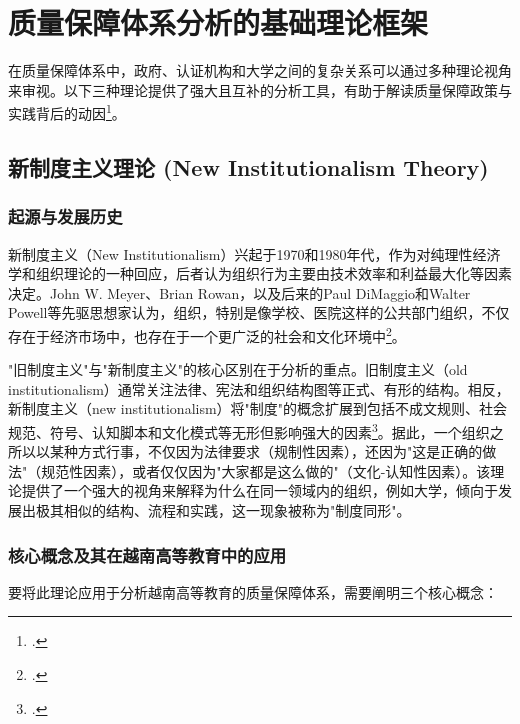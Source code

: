 

\section{质量保障体系分析的基础理论框架}
\label{sec:khung_ly_thuyet_nen_tang}

在质量保障体系中，政府、认证机构和大学之间的复杂关系可以通过多种理论视角来审视。以下三种理论提供了强大且互补的分析工具，有助于解读质量保障政策与实践背后的动因\footcite{OxfordResearch}。

\subsection{新制度主义理论 (New Institutionalism Theory)}
\label{subsec:tan_the_che_nen_teng}

\subsubsection{起源与发展历史}
新制度主义（New Institutionalism）兴起于1970和1980年代，作为对纯理性经济学和组织理论的一种回应，后者认为组织行为主要由技术效率和利益最大化等因素决定。John W. Meyer、Brian Rowan，以及后来的Paul DiMaggio和Walter Powell等先驱思想家认为，组织，特别是像学校、医院这样的公共部门组织，不仅存在于经济市场中，也存在于一个更广泛的社会和文化环境中\footcite{MeyerRowan1977}。

"旧制度主义"与"新制度主义"的核心区别在于分析的重点。旧制度主义（old institutionalism）通常关注法律、宪法和组织结构图等正式、有形的结构。相反，新制度主义（new institutionalism）将"制度"的概念扩展到包括不成文规则、社会规范、符号、认知脚本和文化模式等无形但影响强大的因素\footcite{MeyerPowell2020}。据此，一个组织之所以以某种方式行事，不仅因为法律要求（规制性因素），还因为"这是正确的做法"（规范性因素），或者仅仅因为"大家都是这么做的"（文化-认知性因素）。该理论提供了一个强大的视角来解释为什么在同一领域内的组织，例如大学，倾向于发展出极其相似的结构、流程和实践，这一现象被称为"制度同形"。

\subsubsection{核心概念及其在越南高等教育中的应用}

要将此理论应用于分析越南高等教育的质量保障体系，需要阐明三个核心概念：

